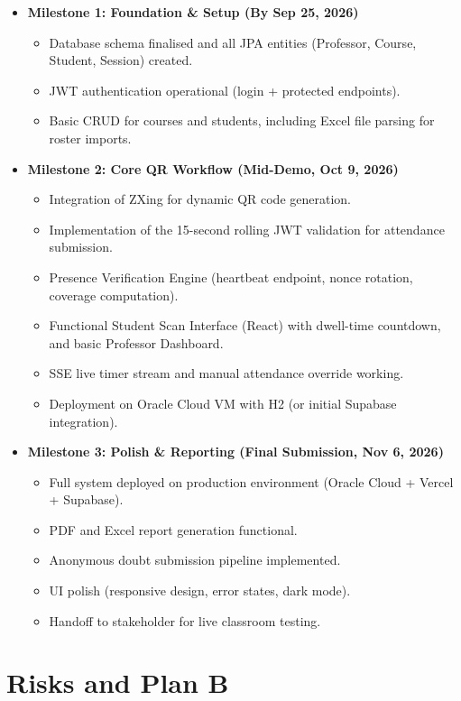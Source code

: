 \documentclass[11pt,a4paper]{article}
\begin{document}
\begin{itemize}
    \item \textbf{Milestone 1: Foundation \& Setup (By Sep 25, 2026)}
    \begin{itemize}
        \item Database schema finalised and all JPA entities (Professor, Course, Student, Session) created.
        \item JWT authentication operational (login + protected endpoints).
        \item Basic CRUD for courses and students, including Excel file parsing for roster imports.
    \end{itemize}
    \item \textbf{Milestone 2: Core QR Workflow (Mid-Demo, Oct 9, 2026)}
    \begin{itemize}
        \item Integration of ZXing for dynamic QR code generation.
        \item Implementation of the 15-second rolling JWT validation for attendance submission.
        \item Presence Verification Engine (heartbeat endpoint, nonce rotation, coverage computation).
        \item Functional Student Scan Interface (React) with dwell-time countdown, and basic Professor Dashboard.
        \item SSE live timer stream and manual attendance override working.
        \item Deployment on Oracle Cloud VM with H2 (or initial Supabase integration).
    \end{itemize}
    \item \textbf{Milestone 3: Polish \& Reporting (Final Submission, Nov 6, 2026)}
    \begin{itemize}
        \item Full system deployed on production environment (Oracle Cloud + Vercel + Supabase).
        \item PDF and Excel report generation functional.
        \item Anonymous doubt submission pipeline implemented.
        \item UI polish (responsive design, error states, dark mode).
        \item Handoff to stakeholder for live classroom testing.
    \end{itemize}
\end{itemize}

\section{Risks and Plan B}
\end{document}
